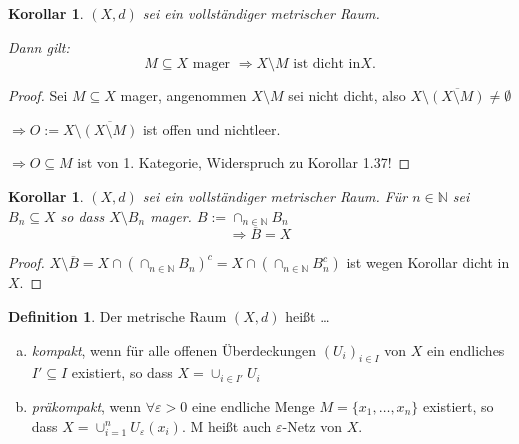 \documentclass[ngerman]{report}
\theoremstyle{plain}%
\newtheorem{cor}[thm]{Korollar}
\theoremstyle{definition}%
\newtheorem{definition}[thm]{Definition}
\theoremstyle{myStyle}
\newcommand{\N}{\mathbb{N}}
\newcommand{\df}[1][]{%
	\overset{#1}{\Rightarrow}
}
\begin{document}
\begin{cor}
	$(X,d)$ sei ein vollständiger metrischer Raum.\par 
	Dann gilt: 
	$$ M\subseteq X \text{ mager } \df X\setminus M \text{ ist dicht in} X.$$
\end{cor}
\begin{proof}
	Sei $M\subseteq X$ mager, angenommen $X\setminus M$ sei nicht dicht, also
	$X\setminus \overline{(X\setminus M)}\not= \emptyset$\par 
	$\df O:=X\setminus \overline{(X\setminus M)}$ ist offen und nichtleer.\par 
	$\df O \subseteq M$ ist von 1. Kategorie, Widerspruch zu Korollar 1.37!
\end{proof}

\begin{cor}
	$(X,d)$ sei ein vollständiger metrischer Raum. Für $n\in\N$ sei $B_n \subseteq X$ so dass $X\setminus B_n$ mager. $B:=\cap_{n\in\N}  B_n$
	$$\df \overline{B} = X$$
\end{cor}
\begin{proof}
	$X\setminus\overline{B} = X\cap (\cap_{n\in\N} B_n)^c = X \cap (\cap_{n\in\N} B_n^c)$ ist wegen Korollar dicht in $X$.
\end{proof}

\begin{definition}
	Der metrische Raum $(X,d)$ heißt \dots
	\begin{enumerate}[(a)]
	\item \textit{kompakt}, wenn für alle offenen Überdeckungen $(U_i)_{i\in I}$ von $X$ ein endliches $I'\subseteq I$ existiert, so dass $X = \cup_{i\in I'} U_i$
	
	\item \textit{präkompakt}, wenn $\forall \varepsilon > 0$ eine endliche Menge $M = \{x_1,\dots, x_n\}$ existiert, so dass $X = \cup^n_{i=1} U_\varepsilon (x_i)$. M heißt auch $\varepsilon$-Netz von $X$.
\end{enumerate}		
\end{definition}
\end{document}
